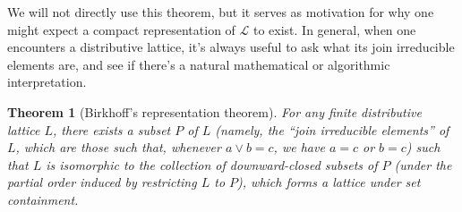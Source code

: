 \documentclass[12pt]{article}
\renewcommand{\L}{\mathcal{L}}
\newtheorem{theorem}[definition]{Theorem}
\begin{document}
  We will not directly use this theorem, but it serves as motivation for why one
  might expect a compact representation of $\L$ to exist.
  In general, when one encounters a distributive lattice, it's always useful to
  ask what its join irreducible elements are, and see if there's a natural
  mathematical or algorithmic interpretation.
  \begin{theorem}[Birkhoff's representation theorem]
    For any finite distributive lattice $L$, there exists a subset $P$ of $L$
    (namely, the ``join irreducible elements'' of $L$, which are those such
    that, whenever $a\vee b = c$, we have $a=c$ or $b=c$) such that
    $L$ is isomorphic to the collection of downward-closed subsets of $P$
    (under the partial order induced by restricting $L$ to $P$), which
    forms a lattice under set containment.
  \end{theorem}
\end{document}

